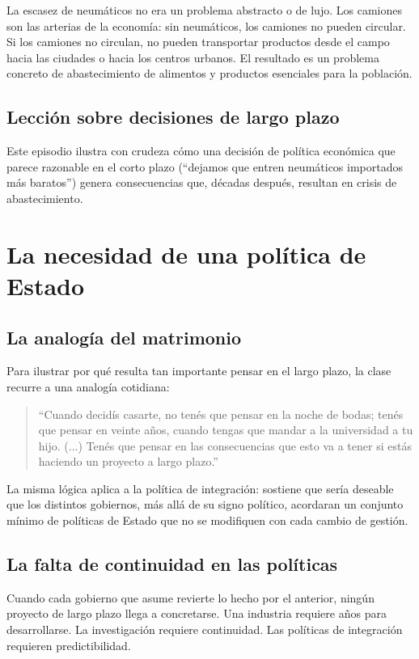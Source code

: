 \documentclass[12pt,oneside]{book}
\begin{document}
La escasez de neumáticos no era un problema abstracto o de lujo. Los camiones son las arterias de la economía: sin neumáticos, los camiones no pueden circular. Si los camiones no circulan, no pueden transportar productos desde el campo hacia las ciudades o hacia los centros urbanos. El resultado es un problema concreto de abastecimiento de alimentos y productos esenciales para la población.

\subsection{Lección sobre decisiones de largo plazo}

Este episodio ilustra con crudeza cómo una decisión de política económica que parece razonable en el corto plazo (``dejamos que entren neumáticos importados más baratos'') genera consecuencias que, décadas después, resultan en crisis de abastecimiento.

\section{La necesidad de una política de Estado}

\subsection{La analogía del matrimonio}

Para ilustrar por qué resulta tan importante pensar en el largo plazo, la clase recurre a una analogía cotidiana:

\begin{quote}
``Cuando decidís casarte, no tenés que pensar en la noche de bodas; tenés que pensar en veinte años, cuando tengas que mandar a la universidad a tu hijo. (...) Tenés que pensar en las consecuencias que esto va a tener si estás haciendo un proyecto a largo plazo.''
\end{quote}

La misma lógica aplica a la política de integración: sostiene que sería deseable que los distintos gobiernos, más allá de su signo político, acordaran un conjunto mínimo de políticas de Estado que no se modifiquen con cada cambio de gestión.

\subsection{La falta de continuidad en las políticas}

Cuando cada gobierno que asume revierte lo hecho por el anterior, ningún proyecto de largo plazo llega a concretarse. Una industria requiere años para desarrollarse. La investigación requiere continuidad. Las políticas de integración requieren predictibilidad.
\end{document}
